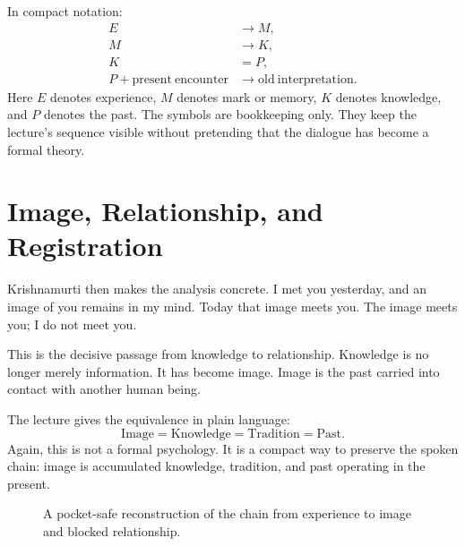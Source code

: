 In compact notation:
\begin{align}
E &\longrightarrow M,\\
M &\longrightarrow K,\\
K &= P,\\
P + \mathrm{present\ encounter}
&\longrightarrow
\mathrm{old\ interpretation}.
\end{align}
Here \(E\) denotes experience, \(M\) denotes mark or memory, \(K\) denotes knowledge, and \(P\) denotes the past. The symbols are bookkeeping only. They keep the lecture's sequence visible without pretending that the dialogue has become a formal theory.

\section{Image, Relationship, and Registration}

Krishnamurti then makes the analysis concrete. I met you yesterday, and an image of you remains in my mind. Today that image meets you. The image meets you; I do not meet you.

This is the decisive passage from knowledge to relationship. Knowledge is no longer merely information. It has become image. Image is the past carried into contact with another human being.

The lecture gives the equivalence in plain language:
\begin{equation}
\mathrm{Image}
=
\mathrm{Knowledge}
=
\mathrm{Tradition}
=
\mathrm{Past}.
\end{equation}
Again, this is not a formal psychology. It is a compact way to preserve the spoken chain: image is accumulated knowledge, tradition, and past operating in the present.

\begin{figure}
\centering
{}
\caption{A pocket-safe reconstruction of the chain from experience to image and blocked relationship.}
\end{figure}

